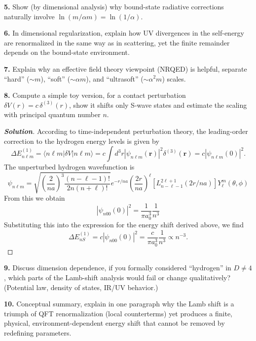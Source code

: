 \documentclass[11pt]{article}
\newenvironment{solution}[1][]{\begin{proof}[\textbf{Solution}]}{\end{proof}}
\begin{document}
\begin{tcolorbox}[problem]
\textbf{5.} Show (by dimensional analysis) why bound-state radiative corrections naturally involve $\ln(m/\alpha m)=\ln(1/\alpha)$.
\end{tcolorbox}

\begin{tcolorbox}[problem]
\textbf{6.} In dimensional regularization, explain how UV divergences in the self-energy are renormalized in the same way as in scattering, yet the finite remainder depends on the bound-state environment.
\end{tcolorbox}

\begin{tcolorbox}[problem]
\textbf{7.} Explain why an effective field theory viewpoint (NRQED) is helpful, separate ``hard'' ($\sim m$), ``soft'' ($\sim \alpha m$), and ``ultrasoft'' ($\sim \alpha^2 m$) scales.
\end{tcolorbox}

\begin{tcolorbox}[problem]
\textbf{8.} Compute a simple toy version, for a contact perturbation $\delta V(r)=c\,\delta^{(3)}(r)$, show it shifts only S-wave states and estimate the scaling with principal quantum number $n$.
\end{tcolorbox}
\begin{solution}[18.8]
	According to time-independent perturbation theory, the leading-order correction to the hydrogen energy levels is given by   
	\[
	\Delta E_{n\ell m}^{(1)}=\langle n\ell m|\delta V|n\ell m\rangle=c\int d^3r\left|\psi_{n\ell m}(\mathbf{r})\right|^2\delta^{(3)}(\mathbf{r})=c\left|\psi_{n\ell m}(0)\right|^2.
	\]
	The unperturbed hydrogen wavefunction is
	\[
	\psi_{n\ell m}=\sqrt{\left(\frac{2}{na}\right)^{3}\frac{(n-\ell-1)!}{2n\left(n+\ell\right)!}}e^{-r/na}\left(\frac{2r}{na}\right)^{\ell}\left[L_{n-\ell-1}^{2\ell+1}(2r/na)\right]Y_{\ell}^{m}(\theta,\phi)
	\]
	From this we obtain
	\[
	|\psi_{n00}(0)|^2=\frac{1}{\pi a_0^3}\frac{1}{n^3}
	\]
	Substituting this into the expression for the energy shift derived above, we find 
	\[
	\boxed{\Delta E_{nS}^{(1)}=c\left|\psi_{n00}(0)\right|^2=\frac{c}{\pi a_0^3}\frac{1}{n^3}\propto n^{-3}.}
	\]
\end{solution}
\begin{tcolorbox}[problem]
\textbf{9.} Discuss dimension dependence, if you formally considered ``hydrogen'' in $D\neq 4$, which parts of the Lamb-shift analysis would fail or change qualitatively? (Potential law, density of states, IR/UV behavior.)
\end{tcolorbox}

\begin{tcolorbox}[problem]
\textbf{10.} Conceptual summary, explain in one paragraph why the Lamb shift is a triumph of QFT renormalization (local counterterms) yet produces a finite, physical, environment-dependent energy shift that cannot be removed by redefining parameters.
\end{tcolorbox}
\end{document}
